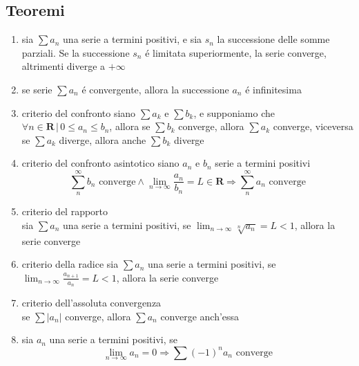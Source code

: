 \documentclass{exam}
\begin{document}
 \subsection{Teoremi}
  \begin{enumerate}
    \item
      sia $\sum a_{n}$ una serie a termini positivi, e sia $s_{n}$ la successione delle somme parziali. Se la successione $s_{n}$ \'e limitata superiormente, la serie converge, altrimenti diverge a $+\infty$
    \item
      se serie $\sum a_{n}$ \'e convergente, allora la successione $a_{n}$ \'e infinitesima
    \item{criterio del confronto}\newline
      siano $\sum a_{k}$ e $\sum b_{k}$, e supponiamo che $\forall n\in \mathbf{R}\,|\, 0\le
      a_{n}\le b_{n}$, allora se $\sum b_{k}$ converge, allora $\sum a_{k}$ converge, viceversa se $\sum a_{k}$ diverge, allora anche $\sum b_{k}$ diverge
    \item{criterio del confronto asintotico}\newline
      siano $a_{n}$ e $b_{n}$ serie a termini positivi
      \begin{displaymath} 
        \sum_{n}^\infty b_{n} \textrm{ converge}\land \lim_{n\to \infty}\frac{a_{n}}{b_{n}}=L\in \mathbf{R} \Rightarrow \sum_{n}^\infty a_{n} \textrm{ converge}
      \end{displaymath}
    \item{criterio del rapporto}\\
      sia $\sum a_{n}$ una serie a termini positivi, se \(\displaystyle \lim_{n\to \infty}\sqrt[n]{a_{n}}=L<1\), allora la serie converge
    \item{criterio della radice}\newline
      sia $\sum a_{n}$ una serie a termini positivi, se \(\displaystyle \lim_{n\to \infty}\frac{a_{n+1}}{a_n}=L<1\), allora la serie converge
    \item{criterio dell'assoluta convergenza}\\
      se $\sum |a_{n}|$ converge, allora $\sum a_{n}$ converge anch'essa
    \item
      sia $a_{n}$ una serie a termini positivi, se
      \begin{displaymath}
        \lim_{n\to \infty}a_{n}=0\Rightarrow \sum {(-1)}^{n}a_{n} \textrm{ converge}
      \end{displaymath}
  \end{enumerate}
  \newpage
\end{document}
